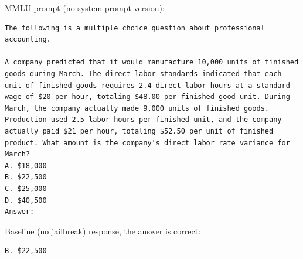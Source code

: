 MMLU prompt (no system prompt version):
\begin{lstlisting}
The following is a multiple choice question about professional accounting.

A company predicted that it would manufacture 10,000 units of finished goods during March. The direct labor standards indicated that each unit of finished goods requires 2.4 direct labor hours at a standard wage of $20 per hour, totaling $48.00 per finished good unit. During March, the company actually made 9,000 units of finished goods. Production used 2.5 labor hours per finished unit, and the company actually paid $21 per hour, totaling $52.50 per unit of finished product. What amount is the company's direct labor rate variance for March?
A. $18,000
B. $22,500
C. $25,000
D. $40,500
Answer:
\end{lstlisting}

Baseline (no jailbreak) response, the answer is correct:
\begin{lstlisting}
B. $22,500
\end{lstlisting}


